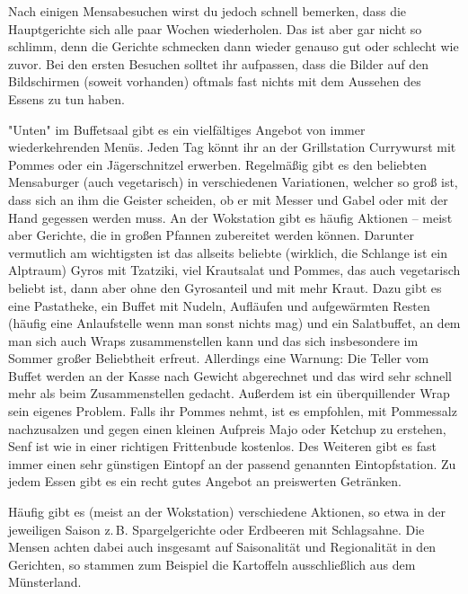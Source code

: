 \begin{multicols}{2}
Nach einigen Mensabesuchen wirst du jedoch schnell bemerken, dass die Hauptgerichte sich alle paar Wochen wiederholen.
Das ist aber gar nicht so schlimm, denn die Gerichte schmecken dann wieder genauso gut oder schlecht wie zuvor.
Bei den ersten Besuchen solltet ihr aufpassen, dass die Bilder auf den Bildschirmen (soweit vorhanden) oftmals fast nichts mit dem Aussehen des Essens zu tun haben.

\begin{center}
\end{center}

"Unten" im Buffetsaal gibt es ein vielfältiges Angebot von immer wiederkehrenden Menüs.
Jeden Tag könnt ihr an der Grillstation Currywurst mit Pommes oder ein Jägerschnitzel erwerben.
Regelmäßig gibt es den beliebten Mensaburger (auch vegetarisch) in verschiedenen Variationen, welcher so groß ist, dass sich an ihm die Geister scheiden, ob er mit Messer und Gabel oder mit der Hand gegessen werden muss.
An der Wokstation gibt es häufig Aktionen – meist aber Gerichte, die in großen Pfannen zubereitet werden können. Darunter vermutlich am wichtigsten ist das allseits beliebte (wirklich, die Schlange ist ein Alptraum) Gyros mit Tzatziki, viel Krautsalat und Pommes, das auch vegetarisch beliebt ist, dann aber ohne den Gyrosanteil und mit mehr Kraut.
Dazu gibt es eine Pastatheke, ein Buffet mit Nudeln, Aufläufen und aufgewärmten Resten (häufig eine Anlaufstelle wenn man sonst nichts mag) und ein Salatbuffet, an dem man sich auch Wraps zusammenstellen kann und das sich insbesondere im Sommer großer Beliebtheit erfreut. Allerdings eine Warnung: Die Teller vom Buffet werden an der Kasse nach Gewicht abgerechnet und das wird sehr schnell mehr als beim Zusammenstellen gedacht. Außerdem ist ein überquillender Wrap sein eigenes Problem.
Falls ihr Pommes nehmt, ist es empfohlen, mit Pommessalz nachzusalzen und gegen einen kleinen Aufpreis Majo oder Ketchup zu erstehen, Senf ist wie in einer richtigen Frittenbude kostenlos.
Des Weiteren gibt es fast immer einen sehr günstigen Eintopf an der passend genannten Eintopfstation.
Zu jedem Essen gibt es ein recht gutes Angebot an preiswerten Getränken.

Häufig gibt es (meist an der Wokstation) verschiedene Aktionen, so etwa in der jeweiligen Saison z.\,B. Spargelgerichte oder Erdbeeren mit Schlagsahne. Die Mensen achten dabei auch insgesamt auf Saisonalität und Regionalität in den Gerichten, so stammen zum Beispiel die Kartoffeln ausschließlich aus dem Münsterland.


\end{multicols}
